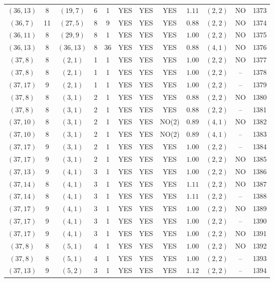 \begin{longtable}{|c|c|c|c|c|c|c|c|c|c|c|c|}
$(36,13)$ & 8 & $(19,7)$ & 6 & 1 & YES & YES & YES & $1.11$ & $(2,2)$ & NO & 1373\\
$(36,7)$ & 11 & $(27,5)$ & 8 & 9 & YES & YES & YES & $0.88$ & $(2,2)$ & NO & 1374\\
$(36,11)$ & 8 & $(29,9)$ & 8 & 1 & YES & YES & YES & $1.00$ & $(2,2)$ & NO & 1375\\
$(36,13)$ & 8 & $(36,13)$ & 8 & 36 & YES & YES & YES & $0.88$ & $(4,1)$ & NO & 1376\\
$(37,8)$ & 8 & $(2,1)$ & 1 & 1 & YES & YES & YES & $1.00$ & $(2,2)$ & NO & 1377\\
$(37,8)$ & 8 & $(2,1)$ & 1 & 1 & YES & YES & YES & $1.00$ & $(2,2)$ & -- & 1378\\
$(37,17)$ & 9 & $(2,1)$ & 1 & 1 & YES & YES & YES & $1.00$ & $(2,2)$ & -- & 1379\\
$(37,8)$ & 8 & $(3,1)$ & 2 & 1 & YES & YES & YES & $0.88$ & $(2,2)$ & NO & 1380\\
$(37,8)$ & 8 & $(3,1)$ & 2 & 1 & YES & YES & YES & $0.88$ & $(2,2)$ & -- & 1381\\
$(37,10)$ & 8 & $(3,1)$ & 2 & 1 & YES & YES & NO(2) & $0.89$ & $(4,1)$ & NO & 1382\\
$(37,10)$ & 8 & $(3,1)$ & 2 & 1 & YES & YES & NO(2) & $0.89$ & $(4,1)$ & -- & 1383\\
$(37,17)$ & 9 & $(3,1)$ & 2 & 1 & YES & YES & YES & $1.00$ & $(2,2)$ & -- & 1384\\
$(37,17)$ & 9 & $(3,1)$ & 2 & 1 & YES & YES & YES & $1.00$ & $(2,2)$ & NO & 1385\\
$(37,13)$ & 9 & $(4,1)$ & 3 & 1 & YES & YES & YES & $1.00$ & $(2,2)$ & NO & 1386\\
$(37,14)$ & 8 & $(4,1)$ & 3 & 1 & YES & YES & YES & $1.11$ & $(2,2)$ & NO & 1387\\
$(37,14)$ & 8 & $(4,1)$ & 3 & 1 & YES & YES & YES & $1.11$ & $(2,2)$ & -- & 1388\\
$(37,17)$ & 9 & $(4,1)$ & 3 & 1 & YES & YES & YES & $1.00$ & $(2,2)$ & NO & 1389\\
$(37,17)$ & 9 & $(4,1)$ & 3 & 1 & YES & YES & YES & $1.00$ & $(2,2)$ & -- & 1390\\
$(37,17)$ & 9 & $(4,1)$ & 3 & 1 & YES & YES & YES & $1.00$ & $(2,2)$ & NO & 1391\\
$(37,8)$ & 8 & $(5,1)$ & 4 & 1 & YES & YES & YES & $1.00$ & $(2,2)$ & NO & 1392\\
$(37,8)$ & 8 & $(5,1)$ & 4 & 1 & YES & YES & YES & $1.00$ & $(2,2)$ & -- & 1393\\
$(37,13)$ & 9 & $(5,2)$ & 3 & 1 & YES & YES & YES & $1.12$ & $(2,2)$ & -- & 1394\\

\end{longtable}
